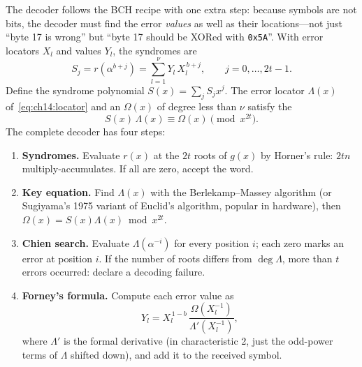 The decoder follows the BCH recipe with one extra step: because symbols are not bits, the decoder
must find the error \emph{values} as well as their locations---not just ``byte 17 is wrong'' but ``byte
17 should be XORed with \texttt{0x5A}''. With error locators $X_l$ and values $Y_l$, the syndromes are
\begin{equation}
S_j=r(\alpha^{b+j})=\sum_{l=1}^{\nu}Y_l\,X_l^{\,b+j},\qquad j=0,\dots,2t-1.
\end{equation}
Define the syndrome polynomial $S(x)=\sum_jS_jx^j$. The error locator $\Lambda(x)$
of~\eqref{eq:ch14:locator} and an  $\Omega(x)$ of degree less than
$\nu$ satisfy the 
\begin{equation}
S(x)\,\Lambda(x)\equiv\Omega(x)\pmod{x^{2t}}.
\label{eq:ch14:key}
\end{equation}
The complete decoder has four steps:
\begin{enumerate}
\item \textbf{Syndromes.} Evaluate $r(x)$ at the $2t$ roots of $g(x)$ by Horner's rule: $2tn$
multiply-accumulates. If all are zero, accept the word.
\item \textbf{Key equation.} Find $\Lambda(x)$ with the Berlekamp--Massey algorithm (or Sugiyama's
1975 variant of Euclid's algorithm, popular in hardware), then $\Omega(x)=S(x)\Lambda(x)\bmod
x^{2t}$.
\item \textbf{Chien search.} Evaluate $\Lambda(\alpha^{-i})$ for every position $i$; each zero marks
an error at position $i$. If the number of roots differs from $\deg\Lambda$, more than $t$ errors
occurred: declare a decoding failure.
\item \textbf{Forney's formula.} Compute each error value as
\begin{equation}
Y_l=X_l^{\,1-b}\,\frac{\Omega(X_l^{-1})}{\Lambda'(X_l^{-1})},
\label{eq:ch14:forney}
\end{equation}
where $\Lambda'$ is the formal derivative (in characteristic 2, just the odd-power terms of
$\Lambda$ shifted down), and add it to the received symbol.
\end{enumerate}

